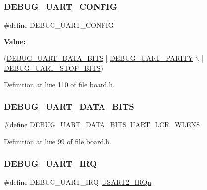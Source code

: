\subsubsection{\texorpdfstring{D\+E\+B\+U\+G\+\_\+\+U\+A\+R\+T\+\_\+\+C\+O\+N\+F\+IG}{DEBUG\_UART\_CONFIG}}
{\footnotesize\ttfamily \#define D\+E\+B\+U\+G\+\_\+\+U\+A\+R\+T\+\_\+\+C\+O\+N\+F\+IG}

{\bfseries Value\+:}
\begin{DoxyCode}
(\hyperlink{group__hal_ga5461cba1b266ac88e586ceb025c2a993}{DEBUG\_UART\_DATA\_BITS} | \hyperlink{group__hal_gaec7cd5ed121d05a86fd013b6456ed725}{DEBUG\_UART\_PARITY} \(\backslash\)
                                    | \hyperlink{group__hal_gacc0b498b69723d16453ec5321d766427}{DEBUG\_UART\_STOP\_BITS})
\end{DoxyCode}


Definition at line 110 of file board.\+h.

\mbox{\label{group__hal_ga5461cba1b266ac88e586ceb025c2a993}} 
\subsubsection{\texorpdfstring{D\+E\+B\+U\+G\+\_\+\+U\+A\+R\+T\+\_\+\+D\+A\+T\+A\+\_\+\+B\+I\+TS}{DEBUG\_UART\_DATA\_BITS}}
{\footnotesize\ttfamily \#define D\+E\+B\+U\+G\+\_\+\+U\+A\+R\+T\+\_\+\+D\+A\+T\+A\+\_\+\+B\+I\+TS~\hyperlink{group___u_a_r_t__18_x_x__43_x_x_ga71ecde192fb0c9facb9ef9c6b77cc687}{U\+A\+R\+T\+\_\+\+L\+C\+R\+\_\+\+W\+L\+E\+N8}}



Definition at line 99 of file board.\+h.

\mbox{\label{group__hal_ga753111eb59a5414820fd948b0689054d}} 
\subsubsection{\texorpdfstring{D\+E\+B\+U\+G\+\_\+\+U\+A\+R\+T\+\_\+\+I\+RQ}{DEBUG\_UART\_IRQ}}
{\footnotesize\ttfamily \#define D\+E\+B\+U\+G\+\_\+\+U\+A\+R\+T\+\_\+\+I\+RQ~\hyperlink{group___c_m_s_i_s__43_x_x___m0___i_r_q_gga402456eb2f4f5b3dc2a53f725eed9485a3f9c48714d0e5baaba6613343f0da68e}{U\+S\+A\+R\+T2\+\_\+\+I\+R\+Qn}}



